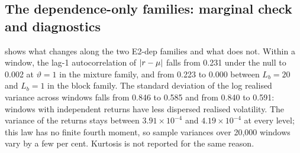 \begin{table}[tbp]
  \centering
  \caption{Power against the dependence-only families of E2-dep with Wilson 95\% intervals:
    rejection rates at $\alpha=0.05$, independent windows of $L=20$ days, $n=2000$ windows per
    sample, 100 replications under $H_0$ ($k=0$) and 50 at each alternative.}
  \label{tab:e2dep-power}
  \small
\end{table}

\subsection{The dependence-only families: marginal check and diagnostics}\label{app:sim-dep}

 shows what changes along the two E2-dep families and what does not. Within a
window, the lag-1 autocorrelation of $\lvert r-\mu\rvert$ falls from 0.231 under the null to 0.002 at
$\vartheta=1$ in the mixture family, and from 0.223 to 0.000 between $L_b=20$ and $L_b=1$ in the
block family. The standard deviation of the log realised variance across windows falls from 0.846
to 0.585 and from 0.840 to 0.591: windows with independent returns have less dispersed realised
volatility. The variance of the returns stays between $3.91\times10^{-4}$ and $4.19\times10^{-4}$
at every level; this \GARCHt{} law has no finite fourth moment, so sample variances over 20,000
windows vary by a few per cent. Kurtosis is not reported for the same reason.

